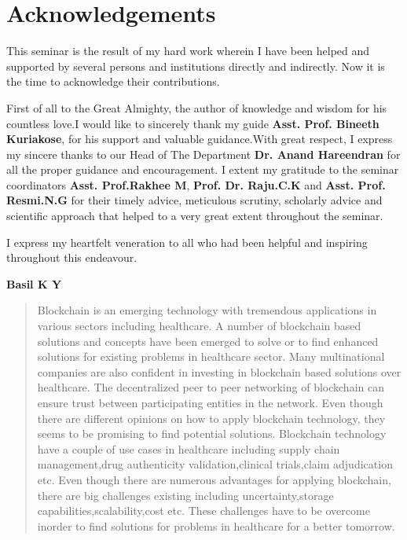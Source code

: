 \documentclass[12pt]{report}
\begin{document}
\section*{\centering Acknowledgements}
\vspace{1cm}
\par This seminar is the result of my hard work wherein I have been helped and supported by several persons and institutions directly and indirectly. Now it is the time to acknowledge their contributions. 

\par First of all to the Great Almighty, the author of knowledge and wisdom for his countless love.I would like to sincerely thank my guide \textbf{Asst. Prof. Bineeth Kuriakose}, for his support and valuable guidance.With great respect, I express my sincere thanks to our Head of The Department \textbf{Dr. Anand Hareendran} for all the proper guidance and encouragement. I extent my gratitude to the seminar coordinators \textbf{Asst. Prof.Rakhee M}, \textbf{Prof. Dr. Raju.C.K} and \textbf{Asst. Prof. Resmi.N.G} for their timely advice, meticulous scrutiny, scholarly advice and scientific approach that helped to a very great extent throughout the seminar.

\par I express my heartfelt veneration to all who had been helpful and inspiring throughout this endeavour.

\vspace{1cm}
\null\hfill \textbf{Basil K Y}
\newpage

\begin{abstract}

Blockchain is an emerging technology with tremendous applications in various sectors including healthcare. A number of blockchain based solutions and concepts have been emerged to solve or to find enhanced solutions for existing problems in healthcare sector. Many multinational companies are also confident in investing in blockchain based solutions over healthcare. The decentralized peer to peer networking of blockchain can ensure trust between participating entities in the network. Even though there are different opinions on how to apply blockchain technology, they seems to be promising to find potential solutions. Blockchain technology have a couple of use cases in healthcare including supply chain management,drug authenticity validation,clinical trials,claim adjudication etc. Even though there are numerous advantages for applying blockchain, there are big challenges existing including uncertainty,storage capabilities,scalability,cost etc. These challenges have to be overcome inorder to find solutions for problems in healthcare for a better tomorrow.
\end{abstract}
\end{document}
